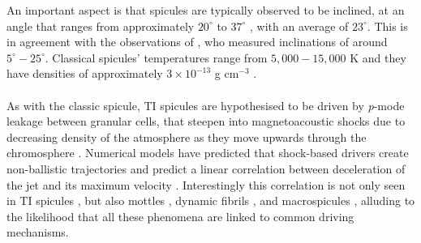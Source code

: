 \documentclass[12pt]{ociamthesis}
\newcommand{\np}{\\ \\}
\begin{document}
%
An important aspect is that spicules are typically observed to be inclined, at an angle that ranges from approximately $20^{\circ}$ \citep{Beckers1968} to $37^{\circ}$ \citep{Trujillo2005ApJ619L191T}, with an average of $23^{\circ}$. This is in agreement with the observations of \cite{Pereira2012}, who measured inclinations of around $5^{\circ}-25^{\circ}$. Classical spicules' temperatures range from $5,000-15,000$ K and they have densities of approximately $3\times10^{-13}$ g cm$^{-3}$ \citep{Sterling_2000SoPh}. \np 
%
As with the classic spicule, TI spicules are hypothesised to be driven by \textit{p}-mode leakage between granular cells, that steepen into magnetoacoustic shocks due to decreasing density of the atmosphere as they move upwards through the chromosphere \citep{Pontieu2004Natur, Pontieu2007PASJ, Mart2009ApJ7011569M}. Numerical models have predicted that shock-based drivers create non-ballistic trajectories and predict a linear correlation between deceleration of the jet and its maximum velocity \citep{Heggland2007ApJ6661277H}. Interestingly this correlation is not only seen in TI spicules \citep{Pereira2012}, but also mottles \citep{Rouppe2007ApJ660L169R}, dynamic fibrils \citep{De_Pontieu2007ApJ}, and macrospicules \citep{Loboda2019ApJ871230L}, alluding to the likelihood that all these phenomena are linked to common driving mechanisms.
\end{document}
